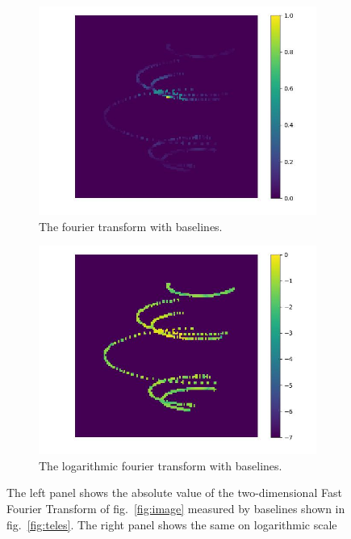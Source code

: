 \begin{figure}
	\centering
	\begin{subfigure}{0.5\linewidth}
		\includegraphics[width=\linewidth]{fig/ft/ft_base.jpg}
		\caption{The fourier transform with baselines.}
	\end{subfigure}\hfill
	\begin{subfigure}{0.5\linewidth}
		\includegraphics[width=\linewidth]{fig/ft/ft_log_base.jpg}
		\caption{The logarithmic fourier transform with baselines.}
	\end{subfigure}
	\caption{The left panel shows the absolute value of the two-dimensional Fast Fourier Transform of fig.~\ref{fig:image} measured by baselines shown in fig.~\ref{fig:teles}. The right panel shows the same on logarithmic scale}
	\label{fig:ft_base}
\end{figure}

